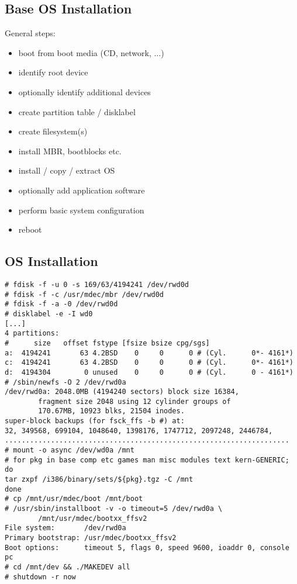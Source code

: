 \documentclass[xga]{xdvislides}
\begin{document}
\subsection{Base OS Installation}
General steps:
\begin{itemize}
	\item boot from boot media (CD, network, ...)
	\item identify root device
	\item optionally identify additional devices
	\item create partition table / disklabel
	\item create filesystem(s)
	\item install MBR, bootblocks etc.
	\item install / copy / extract OS
	\item optionally add application software
	\item perform basic system configuration
	\item reboot
\end{itemize}

\subsection{OS Installation}
\small
\begin{verbatim}
# fdisk -f -u 0 -s 169/63/4194241 /dev/rwd0d
# fdisk -f -c /usr/mdec/mbr /dev/rwd0d
# fdisk -f -a -0 /dev/rwd0d
# disklabel -e -I wd0
[...]
4 partitions:
#      size   offset fstype [fsize bsize cpg/sgs]
a:  4194241       63 4.2BSD    0     0      0 # (Cyl.      0*- 4161*)
c:  4194241       63 4.2BSD    0     0      0 # (Cyl.      0*- 4161*)
d:  4194304        0 unused    0     0      0 # (Cyl.      0 - 4161*)
# /sbin/newfs -O 2 /dev/rwd0a
/dev/rwd0a: 2048.0MB (4194240 sectors) block size 16384,
        fragment size 2048 using 12 cylinder groups of
        170.67MB, 10923 blks, 21504 inodes.
super-block backups (for fsck_ffs -b #) at:
32, 349568, 699104, 1048640, 1398176, 1747712, 2097248, 2446784,
....................................................................
# mount -o async /dev/wd0a /mnt
# for pkg in base comp etc games man misc modules text kern-GENERIC; do
tar zxpf /i386/binary/sets/${pkg}.tgz -C /mnt
done
# cp /mnt/usr/mdec/boot /mnt/boot
# /usr/sbin/installboot -v -o timeout=5 /dev/rwd0a \
        /mnt/usr/mdec/bootxx_ffsv2
File system:       /dev/rwd0a
Primary bootstrap: /usr/mdec/bootxx_ffsv2
Boot options:      timeout 5, flags 0, speed 9600, ioaddr 0, console pc
# cd /mnt/dev && ./MAKEDEV all
# shutdown -r now
\end{verbatim}
\Normalsize
\end{document}
